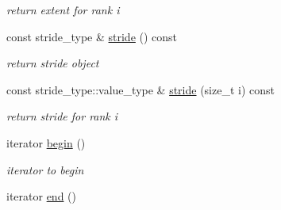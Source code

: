 \begin{DoxyCompactItemize}
\begin{DoxyCompactList}\small\item\em return extent for rank i \item\end{DoxyCompactList}\item 
\hypertarget{classbtas_1_1_tensor_3_01_t_00_010ul_00_01_order_01_4_adcdf04e69e56d1429bdd23ef66a675f0}{
const stride\_\-type \& \hyperlink{classbtas_1_1_tensor_3_01_t_00_010ul_00_01_order_01_4_adcdf04e69e56d1429bdd23ef66a675f0}{stride} () const }
\label{classbtas_1_1_tensor_3_01_t_00_010ul_00_01_order_01_4_adcdf04e69e56d1429bdd23ef66a675f0}

\begin{DoxyCompactList}\small\item\em return stride object \item\end{DoxyCompactList}\item 
\hypertarget{classbtas_1_1_tensor_3_01_t_00_010ul_00_01_order_01_4_a5b61a23bba01b3f02480ba470f341837}{
const stride\_\-type::value\_\-type \& \hyperlink{classbtas_1_1_tensor_3_01_t_00_010ul_00_01_order_01_4_a5b61a23bba01b3f02480ba470f341837}{stride} (size\_\-t i) const }
\label{classbtas_1_1_tensor_3_01_t_00_010ul_00_01_order_01_4_a5b61a23bba01b3f02480ba470f341837}

\begin{DoxyCompactList}\small\item\em return stride for rank i \item\end{DoxyCompactList}\item 
\hypertarget{classbtas_1_1_tensor_3_01_t_00_010ul_00_01_order_01_4_a3960f38ad51624430958906f6ef8c225}{
iterator \hyperlink{classbtas_1_1_tensor_3_01_t_00_010ul_00_01_order_01_4_a3960f38ad51624430958906f6ef8c225}{begin} ()}
\label{classbtas_1_1_tensor_3_01_t_00_010ul_00_01_order_01_4_a3960f38ad51624430958906f6ef8c225}

\begin{DoxyCompactList}\small\item\em iterator to begin \item\end{DoxyCompactList}\item 
\hypertarget{classbtas_1_1_tensor_3_01_t_00_010ul_00_01_order_01_4_ac5304f39581cda9dcc15762e97c8f590}{
iterator \hyperlink{classbtas_1_1_tensor_3_01_t_00_010ul_00_01_order_01_4_ac5304f39581cda9dcc15762e97c8f590}{end} ()}
\label{classbtas_1_1_tensor_3_01_t_00_010ul_00_01_order_01_4_ac5304f39581cda9dcc15762e97c8f590}


\end{DoxyCompactItemize}
